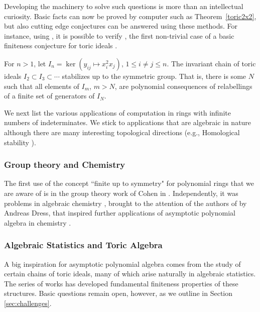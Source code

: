 Developing the machinery to solve such questions is more than an intellectual curiosity.  Basic facts can now be proved by computer such as Theorem~\ref{toric2x2}, but also cutting edge conjectures can be answered using these methods.  For instance, using \cite{EquivariantGB}, it is possible to verify \cite{draisma2013noetherianity, Krone:egb-toric}, the first non-trivial case of a basic finiteness conjecture for toric ideals \cite{aschenbrenner2007finite}.  

\begin{theorem}\label{monomthm}
For $n > 1$, let $I_n = \ker (y_{ij} \mapsto x_i^2 x_j)$, $1 \leq i \neq j \leq n$.  The invariant chain of toric ideals $I_2 \subset I_3 \subset \cdots$ stabilizes up to the symmetric group.  That is, there is some $N$ such that all elements of $I_m$, $m > N$, are polynomial consequences of relabellings of a finite set of generators of $I_N$.
\end{theorem}


We next list the various applications of computation in rings with infinite numbers of indeterminates.  
We stick to applications that are algebraic in nature although there are many interesting topological directions (e.g., Homological stability \cite{randal2013homological, church2012homological}).

\subsubsection{Group theory and Chemistry}

The first use of the concept ``finite up to symmetry" for polynomial rings that we are aware of is in the group theory work of Cohen in \cite{cohen1967laws}.  
Independently, it was problems in algebraic chemistry \cite{ruch1967vandermondesche}, brought to the attention of the authors of \cite{aschenbrenner2007finite} by Andreas Dress, that inspired further applications of asymptotic polynomial algebra in chemistry \cite{Draisma08b}.

\subsubsection{Algebraic Statistics and Toric Algebra}

A big inspiration for asymptotic polynomial algebra comes from the study of certain chains of toric ideals, many of which arise naturally in algebraic statistics.  The series of works \cite{Hillar13, hillar2016corrigendum, draisma2013noetherianity, KKL:equivariant-markov} has developed fundamental finiteness properties of these structures.  Basic questions remain open, however, as we outline in Section \ref{sec:challenges}.  

